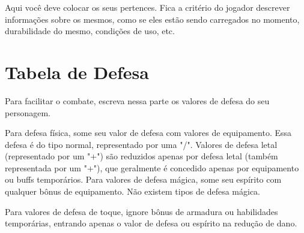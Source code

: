 Aqui você deve colocar os seus pertences. Fica a critério do jogador descrever informações sobre os mesmos, como se eles estão sendo carregados no momento, durabilidade do mesmo, condições de uso, etc.

\section{Tabela de Defesa}

Para facilitar o combate, escreva nessa parte os valores de defesa do seu personagem.

Para defesa física, some seu valor de defesa com valores de equipamento. Essa defesa é do tipo normal, representado por uma "/". Valores de defesa letal (representado por um "+") são reduzidos apenas por defesa letal (também representada por um "+"), que geralmente é concedido apenas por equipamento ou buffs temporários.
Para valores de defesa mágica, some seu espírito com qualquer bônus de equipamento. Não existem tipos de defesa mágica.

Para valores de defesa de toque, ignore bônus de armadura ou habilidades temporárias, entrando apenas o valor de defesa ou espírito na redução de dano.






